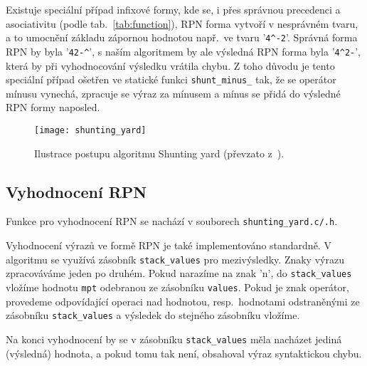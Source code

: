 Existuje speciální případ infixové formy, kde se, i přes správnou precedenci a asociativitu (podle tab.~\ref{tab:function}), RPN forma vytvoří v nesprávném tvaru, a to umocnění základu zápornou hodnotou např.~ve tvaru '\verb|4^-2|'. Správná forma RPN by byla '\verb|42-^|', s naším algoritmem by ale výsledná RPN forma byla '\verb|4^2-|', která by při vyhodnocování výsledku vrátila chybu. Z toho důvodu je tento speciální případ ošetřen ve statické funkci \verb|shunt_minus_| tak, že se operátor mínusu vynechá, zpracuje se výraz za mínusem a mínus se přidá do výsledné RPN formy naposled.

\begin{figure}[ht]
    \centering 
    \texttt{[image: shunting\_yard]}
    \caption{Ilustrace postupu algoritmu Shunting yard (převzato z~\cite{bib:shunting_yard}).}\label{fig:shunting_yard}
\end{figure}

\subsection{Vyhodnocení RPN}
Funkce pro vyhodnocení RPN se nachází v souborech \verb|shunting_yard.c/.h|.

Vyhodnocení výrazů ve formě RPN je také implementováno standardně. V algoritmu se využívá zásobník \verb|stack_values| pro mezivýsledky. Znaky výrazu zpracováváme jeden po druhém. Pokud narazíme na znak 'n', do \verb|stack_values| vložíme hodnotu \verb|mpt| odebranou ze zásobníku \verb|values|. Pokud je znak operátor, provedeme odpovídající operaci nad hodnotou, resp.~hodnotami odstraněnými ze zásobníku \verb|stack_values| a výsledek do stejného zásobníku vložíme.

Na konci vyhodnocení by se v zásobníku \verb|stack_values| měla nacházet jediná (výsledná) hodnota, a pokud tomu tak není, obsahoval výraz syntaktickou chybu.